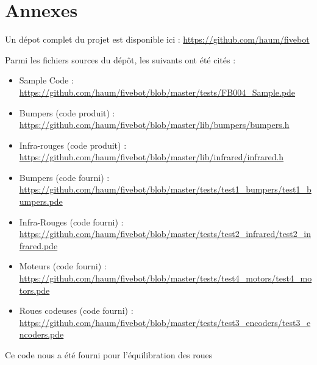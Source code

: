 \documentclass[a4paper]{report}
\begin{document}
\newpage
\section*{Annexes%
  \label{annexes}%
}

Un dépot complet du projet est disponible ici : \url{https://github.com/haum/fivebot}

Parmi les fichiers sources du dépôt, les suivants ont été cités :
%
\begin{itemize}

\item Sample Code : \url{https://github.com/haum/fivebot/blob/master/tests/FB004_Sample.pde}

\item Bumpers (code produit) : \url{https://github.com/haum/fivebot/blob/master/lib/bumpers/bumpers.h}

\item Infra-rouges (code produit) : \url{https://github.com/haum/fivebot/blob/master/lib/infrared/infrared.h}

\item Bumpers (code fourni) : \url{https://github.com/haum/fivebot/blob/master/tests/test1_bumpers/test1_bumpers.pde}

\item Infra-Rouges (code fourni) : \url{https://github.com/haum/fivebot/blob/master/tests/test2_infrared/test2_infrared.pde}

\item Moteurs (code fourni) : \url{https://github.com/haum/fivebot/blob/master/tests/test4_motors/test4_motors.pde}

\item Roues codeuses (code fourni) : \url{https://github.com/haum/fivebot/blob/master/tests/test3_encoders/test3_encoders.pde}

\end{itemize}

Ce code nous a été fourni pour l'équilibration des roues
\end{document}
